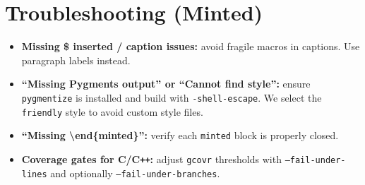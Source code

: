 \documentclass[11pt]{article}
\begin{document}
\section{Troubleshooting (Minted)}
\begin{itemize}
  \item \textbf{Missing \$ inserted / caption issues:} avoid fragile macros in captions. Use paragraph labels instead.
  \item \textbf{``Missing Pygments output'' or ``Cannot find style'':} ensure \texttt{pygmentize} is installed and build with \texttt{-shell-escape}. We select the \texttt{friendly} style to avoid custom style files.
  \item \textbf{``Missing \textbackslash end\{minted\}'':} verify each \texttt{minted} block is properly closed.
  \item \textbf{Coverage gates for C/C\texttt{++}:} adjust \texttt{gcovr} thresholds with \texttt{--fail-under-lines} and optionally \texttt{--fail-under-branches}.
\end{itemize}
\end{document}
